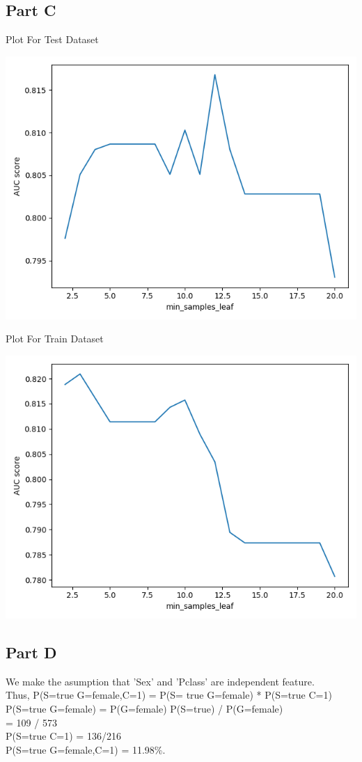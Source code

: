 \documentclass[12pt]{article}
\begin{document}
    \subsection{Part C}\label{subsec:part-c2}
    \begin{center}
        Plot For Test Dataset
    \end{center}
    \includegraphics[scale=0.8]{../Plot/plot_test.png}
    \begin{center}
        Plot For Train Dataset
    \end{center}
    \includegraphics[scale=0.8]{../Plot/plot_train.png}
    \subsection{Part D}\label{subsec:part-d}
    We make the asumption that 'Sex' and 'Pclass' are independent feature. \\
    Thus, {\fontsize{9} P(S=true \lvert G=female,C=1)  = P(S= true \lvert G=female) *
    P(S=true \lvert C=1)} \\
    P(S=true \lvert G=female) = P(G=female) \cap P(S=true) / P(G=female) \\
    = 109 / 573 \\
    P(S=true \lvert C=1) = 136/216 \\
     P(S=true \lvert G=female,C=1) = 11.98\%.
\end{document}
